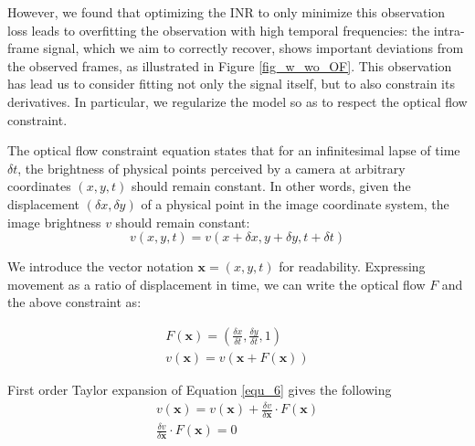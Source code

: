 \documentclass{article}
\begin{document}
However, we found that optimizing the INR to only minimize this observation loss leads to overfitting the observation with high temporal frequencies:
the intra-frame signal, which we aim to correctly recover, shows important deviations from the observed frames, as illustrated in Figure \ref{fig_w_wo_OF}.
This observation has lead us to consider fitting not only the signal itself, but to also constrain its derivatives.
In particular, we regularize the model so as to respect the optical flow constraint.


The optical flow constraint equation states that for an infinitesimal lapse of time $\delta t$,
the brightness of physical points perceived by a camera at arbitrary coordinates $(x,y,t)$ should remain constant.
In other words, given the displacement $(\delta x, \delta y)$ of a physical point in the image coordinate system,
the image brightness $v$ should remain constant:
\begin{equation}
v(x, y, t)=v(x + \delta x, y + \delta y, t + \delta t)
\end{equation}

We introduce the vector notation $\textbf{x}=(x,y,t)$ for readability.
Expressing movement as a ratio of displacement in time,
we can write the optical flow $F$ and the above constraint as:

\begin{equation}
\begin{aligned}
F(\textbf{x})=(\frac{\delta x}{\delta t}, \frac{\delta y}{\delta t}, 1) \\
v(\textbf{x})=v(\textbf{x} + F(\textbf{x}))
\end{aligned}
\label{equ_6}
\end{equation}

First order Taylor expansion of Equation \ref{equ_6} gives the following
\begin{equation}
\begin{aligned}
v(\textbf{x}) = v(\textbf{x}) + \frac{\delta v}{\delta \textbf{x}} \cdot F(\textbf{x}) \\
\frac{\delta v}{\delta \textbf{x}} \cdot F(\textbf{x}) =0
\end{aligned}
\label{equ_7}
\end{equation}
\end{document}

